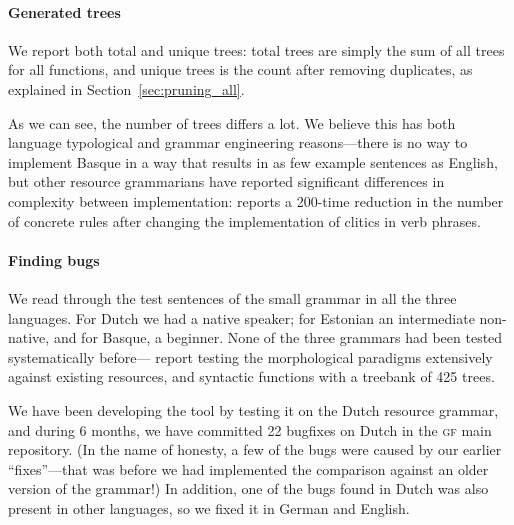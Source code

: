 \documentclass[11pt]{article}
\def\gf{\textsc{gf}}
\newcommand{\todo}[1]{{\color{cyan}\textbf{[TODO: }#1\textbf{]}}}
\begin{document}
\paragraph{Generated trees}

We report both total and unique trees: total trees are simply the sum
of all trees for all functions, and unique trees is the count after
removing duplicates, as explained in Section~\ref{sec:pruning_all}.

As we can see, the number of trees differs a lot. We believe this has
both language typological and grammar engineering reasons---there
is no way to implement Basque in a way that results in as few example
sentences as English, but other resource grammarians have reported
significant differences in complexity between implementation:
\cite{enache2010} reports a 200-time reduction in the number of
concrete rules after changing the implementation of clitics in verb
phrases.



\paragraph{Finding bugs} 
We read through the test sentences of the small grammar in all the
three languages. 
For Dutch we had a native speaker; for Estonian an intermediate non-native,
and for Basque, a beginner. None of the three grammars had been tested
systematically before---\cite{listenmaa_kaljurand2014} report testing
the morphological paradigms extensively against existing resources,
and syntactic functions with a treebank of 425 trees.

We have been developing the tool by testing it on the Dutch resource
grammar, and during 6 months, we have committed 22 bugfixes on Dutch
in the \gf{} main repository. (In the name of honesty, a few of the bugs were
caused by our earlier ``fixes''---that was before we had implemented
the comparison against an older version of the grammar!) In addition,
one of the bugs found in Dutch was also present in other languages, so
we fixed it in German and English.
\end{document}
